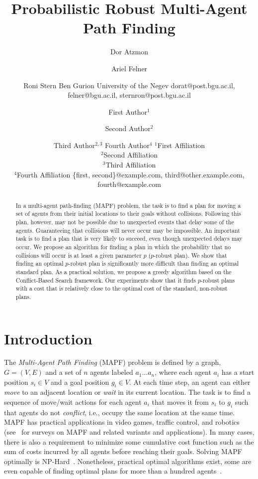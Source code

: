 \documentclass{article}
\title{Probabilistic Robust Multi-Agent Path Finding}
\author{
Dor Atzmon
\and
Ariel Felner\and
Roni Stern
\affiliations
Ben Gurion University of the Negev
\emails
dorat@post.bgu.ac.il,
felner@bgu.ac.il,
sternron@post.bgu.ac.il
}
\author{
First Author$^1$
\and
Second Author$^2$\and
Third Author$^{2,3}$\And
Fourth Author$^4$
\affiliations
$^1$First Affiliation\\
$^2$Second Affiliation\\
$^3$Third Affiliation\\
$^4$Fourth Affiliation
\emails
\{first, second\}@example.com,
third@other.example.com,
fourth@example.com
}
\newcommand\Roni[1]{\nb{\textbf{Roni:}}{orange}{#1}}
\begin{document}
\maketitle


\begin{abstract}

In a multi-agent path-finding (MAPF) problem, the task is to find a plan for moving a set of agents from their initial locations to their goals without collisions.  Following this plan, however, may not be possible due to unexpected events that delay some of the agents. Guaranteeing that collisions will never occur may be impossible. An important task is to find a plan that is very likely to succeed, even though unexpected delays may occur. We propose an algorithm for finding a plan in which the probability that no collisions will occur is at least a given parameter $p$ ($p$-robust plan).
We show that finding an optimal $p$-robust plan is significantly more difficult than finding an optimal standard plan. As a practical solution, we propose a greedy algorithm based on the Conflict-Based Search framework. 
Our experiments show that it finds $p$-robust plans with a cost that is relatively close to the optimal cost of the standard, non-robust plans.
\end{abstract}


\section{Introduction}


The {\em Multi-Agent Path Finding} (MAPF) problem is defined by a graph, $G=(V,E)$ and a set of $n$ agents labeled $a_1 \dots a_n$, where each agent $a_i$ has a start position $s_i \in V$ and a goal position $g_i \in V$. At each time step, an agent can either {\em move} to an adjacent location or {\em wait} in its current location. The task is to find a sequence of move/wait actions for each agent $a_i$ that moves it from $s_i$ to $g_i$ such that agents do not
{\em conflict}, i.e., occupy the same location at the same time. MAPF has practical applications in video games, traffic control, and robotics (see~\cite{felner2017searchBased,MaK17} for surveys on MAPF and related variants and applications). %
In many cases, there is also a requirement to minimize some cumulative cost function such as the sum of costs incurred by all agents before reaching their goals. Solving MAPF optimally is NP-Hard~\cite{DBLP:conf/aaai/YuL13,DBLP:conf/aaai/Surynek10}. Nonetheless, practical optimal algorithms exist, some are even capable of finding optimal plans for more than a hundred  agents~\cite{wagner2015subdimensional,surynek2012towards,yu2013planning,FelnerLB00KK18}.
\end{document}
